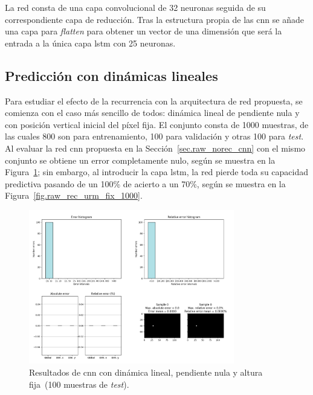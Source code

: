 La red consta de una capa convolucional de 32 neuronas seguida de su correspondiente capa de reducción. Tras la estructura propia de las \acrshort{cnn} se añade una capa para \textit{flatten} para obtener un vector de una dimensión que será la entrada a la única capa \acrshort{lstm} con 25 neuronas.

\subsection{Predicción con dinámicas lineales}
Para estudiar el efecto de la recurrencia con la arquitectura de red propuesta, se comienza con el caso más sencillo de todos: dinámica lineal de pendiente nula y con posición vertical inicial del píxel fija. El conjunto consta de  1000 muestras, de las cuales 800 son para entrenamiento, 100 para validación y otras 100 para \textit{test}. Al evaluar la red \acrshort{cnn} propuesta en la Sección~\ref{sec.raw_norec_cnn} con el mismo conjunto se obtiene un error completamente nulo, según se muestra en la Figura~\ref{fig.raw_norec_urm_fix_1000}; sin embargo, al introducir la capa \acrshort{lstm}, la red pierde toda su capacidad predictiva pasando de un 100\% de acierto a un 70\%, según se muestra en la Figura~\ref{fig.raw_rec_urm_fix_1000}.

\begin{figure}[H]
		\begin{center}
			\includegraphics[width=0.8\textwidth]{ figures/test_raw/NOREC/URM_fix_1000.png}
			\caption{Resultados de \acrshort{cnn} con dinámica lineal, pendiente nula y altura fija~(100 muestras de \textit{test}).} 
			\label{fig.raw_norec_urm_fix_1000}
		\end{center}
\end{figure}
\vspace{-10pt}

